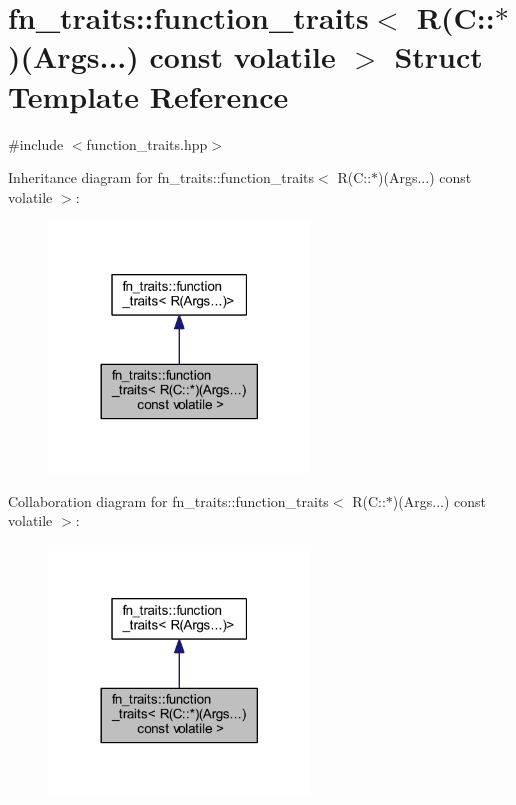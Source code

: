 \hypertarget{structfn__traits_1_1function__traits_3_01_r_07_c_1_1_5_08_07_args_8_8_8_08_01const_01volatile_01_4}{}\section{fn\+\_\+traits\+:\+:function\+\_\+traits$<$ R(C\+:\+:$\ast$)(Args...) const volatile $>$ Struct Template Reference}
\label{structfn__traits_1_1function__traits_3_01_r_07_c_1_1_5_08_07_args_8_8_8_08_01const_01volatile_01_4}


{\ttfamily \#include $<$function\+\_\+traits.\+hpp$>$}



Inheritance diagram for fn\+\_\+traits\+:\+:function\+\_\+traits$<$ R(C\+:\+:$\ast$)(Args...) const volatile $>$\+:\nopagebreak
\begin{figure}[H]
\begin{center}
\leavevmode
\includegraphics[width=197pt]{d3/d22/structfn__traits_1_1function__traits_3_01_r_07_c_1_1_5_08_07_args_8_8_8_08_01const_01volatile_01_4__inherit__graph}
\end{center}
\end{figure}


Collaboration diagram for fn\+\_\+traits\+:\+:function\+\_\+traits$<$ R(C\+:\+:$\ast$)(Args...) const volatile $>$\+:\nopagebreak
\begin{figure}[H]
\begin{center}
\leavevmode
\includegraphics[width=197pt]{db/dc9/structfn__traits_1_1function__traits_3_01_r_07_c_1_1_5_08_07_args_8_8_8_08_01const_01volatile_01_4__coll__graph}
\end{center}
\end{figure}
